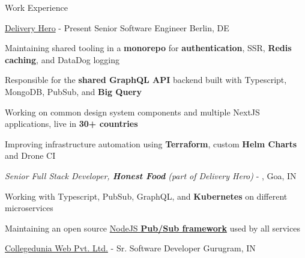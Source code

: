 \documentclass[../resume.tex]{subfiles}
\begin{document}
\begin{rSection}{Work Experience}

\begin{rSubsection}
    {\href{https://go.rohit.page/dh}{Delivery Hero}}
    {  - Present}
    {Senior Software Engineer}
    {Berlin, DE}

    \item Maintaining shared tooling in a \textbf{monorepo} for \textbf{authentication}, SSR, \textbf{Redis caching}, and DataDog logging
    \item Responsible for the \textbf{shared GraphQL API} backend built with Typescript, MongoDB, PubSub, and \textbf{Big Query}
    \item Working on common design system components and multiple NextJS applications, live in \textbf{30+ countries}
    \item Improving infrastructure automation using \textbf{Terraform}, custom \textbf{Helm Charts} and Drone CI

    \begin{rSubsectionHeading}
        {\normalfont \em Senior Full Stack Developer, \textbf{Honest Food} (part of Delivery Hero)}
        {  - , Goa, IN}
        {}{}
    \end{rSubsectionHeading}

    \item Working with Typescript, PubSub, GraphQL, and \textbf{Kubernetes} on different microservices
    \item Maintaining an open source \href{https://go.rohit.page/hfc-pubsub}{NodeJS \textbf{Pub/Sub framework}} used by all services

\end{rSubsection}

\begin{rSubsection}
    {\href{https://go.rohit.page/cd}{Collegedunia Web Pvt. Ltd.}}
    {  -  }
    {Sr. Software Developer}
    {Gurugram, IN}


\end{rSubsection}
\end{rSection}
\end{document}
